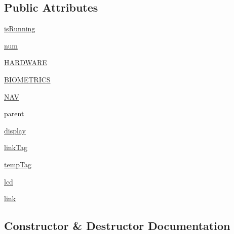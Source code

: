 \subsection*{Public Attributes}
\begin{DoxyCompactItemize}
\item 
\hyperlink{classinterface_1_1MPS__INTERFACE_1_1MPS_a2a4115fef0beac3a7d779288752ce249}{is\+Running}
\item 
\hyperlink{classinterface_1_1MPS__INTERFACE_1_1MPS_adb8db32687598440ce7e66216e8c748e}{num}
\item 
\hyperlink{classinterface_1_1MPS__INTERFACE_1_1MPS_a291026e13d2fa952fde4a49e17d9b511}{H\+A\+R\+D\+W\+A\+R\+E}
\item 
\hyperlink{classinterface_1_1MPS__INTERFACE_1_1MPS_aeabafb17f8e9cf955bfd72b0b3529a25}{B\+I\+O\+M\+E\+T\+R\+I\+C\+S}
\item 
\hyperlink{classinterface_1_1MPS__INTERFACE_1_1MPS_a3a8859fee065b85d96d5ee4328d4df94}{N\+A\+V}
\item 
\hyperlink{classinterface_1_1MPS__INTERFACE_1_1MPS_ac894fc32b9abb11f2630acbfc8986ec6}{parent}
\item 
\hyperlink{classinterface_1_1MPS__INTERFACE_1_1MPS_a37d1576fdc76e650eba03579715397ec}{display}
\item 
\hyperlink{classinterface_1_1MPS__INTERFACE_1_1MPS_a225f5d63503bd40f580fa9a9dcd3e84c}{link\+Tag}
\item 
\hyperlink{classinterface_1_1MPS__INTERFACE_1_1MPS_a7290342997a971ce72256ac74b88a2cd}{temp\+Tag}
\item 
\hyperlink{classinterface_1_1MPS__INTERFACE_1_1MPS_a8f88b02a8164ee47e8597c3a51b81db6}{lcd}
\item 
\hyperlink{classinterface_1_1MPS__INTERFACE_1_1MPS_ad79d277868987caa37c3026503feb744}{link}
\end{DoxyCompactItemize}


\subsection{Constructor \& Destructor Documentation}
\hypertarget{classinterface_1_1MPS__INTERFACE_1_1MPS_a14e3c3c0348bd54317bf9883cec18bfd}{}
